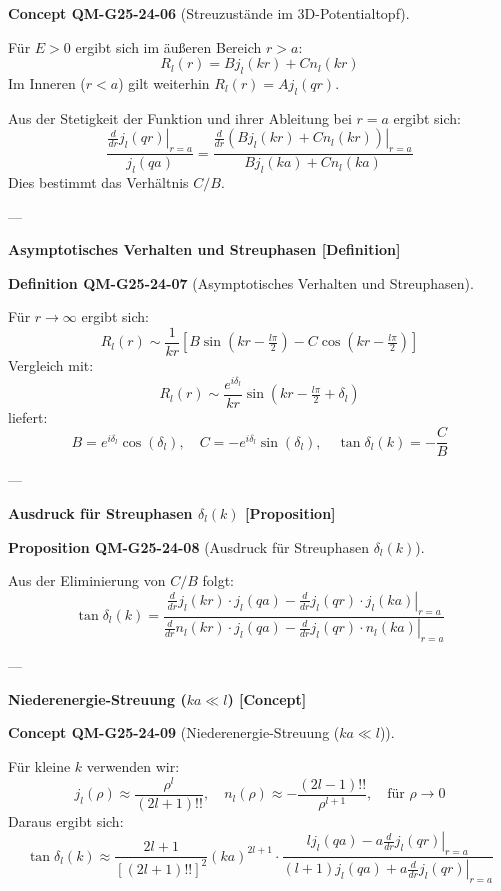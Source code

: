 \documentclass[10pt, letterpaper]{article}
\newcommand{\CustomHeading}[3]{%
  \par\medskip\noindent%
  \textbf{#1 #2} \textnormal{(#3)}.\enskip%
}
\newenvironment{DEF}[2]{\begin{unitbox}\CustomHeading{Definition}{#1}{#2}}{\end{unitbox}}
\newenvironment{PROP}[2]{\begin{unitbox}\CustomHeading{Proposition}{#1}{#2}}{\end{unitbox}}
\newenvironment{CONC}[2]{\begin{unitbox}\CustomHeading{Concept}{#1}{#2}}{\end{unitbox}}
\begin{document}
\begin{CONC}{QM-G25-24-06}{Streuzustände im 3D-Potentialtopf}
Für $E > 0$ ergibt sich im äußeren Bereich $r > a$:
\[
R_l(r) = B j_l(kr) + C n_l(kr)
\]
Im Inneren ($r < a$) gilt weiterhin $R_l(r) = A j_l(qr)$.

Aus der Stetigkeit der Funktion und ihrer Ableitung bei $r = a$ ergibt sich:
\[
\frac{\left. \frac{d}{dr} j_l(qr) \right|_{r=a}}{j_l(qa)} =
\frac{\left. \frac{d}{dr} (B j_l(kr) + C n_l(kr)) \right|_{r=a}}{B j_l(ka) + C n_l(ka)}
\]
Dies bestimmt das Verhältnis $C/B$.
\end{CONC}

---

\textbf{Asymptotisches Verhalten und Streuphasen [Definition]}

\begin{DEF}{QM-G25-24-07}{Asymptotisches Verhalten und Streuphasen}
Für $r \rightarrow \infty$ ergibt sich:
\[
R_l(r) \sim \frac{1}{kr} \left[
B \sin(kr - \tfrac{l\pi}{2}) - C \cos(kr - \tfrac{l\pi}{2})
\right]
\]
Vergleich mit:
\[
R_l(r) \sim \frac{e^{i\delta_l}}{kr} \sin(kr - \tfrac{l\pi}{2} + \delta_l)
\]
liefert:
\[
B = e^{i\delta_l} \cos(\delta_l), \quad
C = -e^{i\delta_l} \sin(\delta_l), \quad
\tan \delta_l(k) = -\frac{C}{B}
\]
\end{DEF}

---

\textbf{Ausdruck für Streuphasen $\delta_l(k)$ [Proposition]}

\begin{PROP}{QM-G25-24-08}{Ausdruck für Streuphasen $\delta_l(k)$}
Aus der Eliminierung von $C/B$ folgt:
\[
\tan \delta_l(k) =
\frac{ \left. \frac{d}{dr} j_l(kr) \cdot j_l(qa) - \frac{d}{dr} j_l(qr) \cdot j_l(ka) \right|_{r=a} }
     { \left. \frac{d}{dr} n_l(kr) \cdot j_l(qa) - \frac{d}{dr} j_l(qr) \cdot n_l(ka) \right|_{r=a} }
\]
\end{PROP}

---

\textbf{Niederenergie-Streuung ($ka \ll l$) [Concept]}

\begin{CONC}{QM-G25-24-09}{Niederenergie-Streuung ($ka \ll l$)}
Für kleine $k$ verwenden wir:
\[
j_l(\rho) \approx \frac{\rho^l}{(2l+1)!!}, \quad
n_l(\rho) \approx -\frac{(2l-1)!!}{\rho^{l+1}}, \quad \text{für } \rho \to 0
\]
Daraus ergibt sich:
\[
\tan \delta_l(k) \approx \frac{2l+1}{[(2l+1)!!]^2} (ka)^{2l+1} \cdot
\frac{l j_l(qa) - a \left. \frac{d}{dr} j_l(qr) \right|_{r=a}}{(l+1) j_l(qa) + a \left. \frac{d}{dr} j_l(qr) \right|_{r=a}}
\]
\end{CONC}
\end{document}
